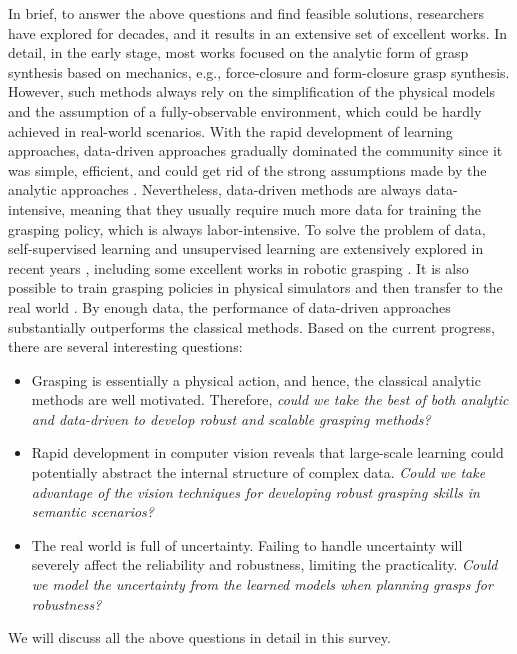 \documentclass[letterpaper,10pt]{article}
\begin{document}
In brief, to answer the above questions and find feasible solutions, researchers have explored for decades, and it results in an extensive set of excellent works. In detail, in the early stage, most works focused on the analytic form of grasp synthesis based on mechanics, e.g., force-closure and form-closure \cite{bicchi1995closure} grasp synthesis. 
However, such methods always rely on the simplification of the physical models and the assumption of a fully-observable environment, which could be hardly achieved in real-world scenarios. 
With the rapid development of learning approaches, data-driven approaches gradually dominated the community since it was simple, efficient, and could get rid of the strong assumptions made by the analytic approaches \cite{bohg2013data}. 
Nevertheless, data-driven methods are always data-intensive, meaning that they usually require much more data for training the grasping policy, which is always labor-intensive.
To solve the problem of data, self-supervised learning and unsupervised learning are extensively explored in recent years \cite{jing2020self, bengio2012unsupervised}, including some excellent works in robotic grasping \cite{mar2015self, pinto2016supersizing, zeng2018learning, berscheid2019improving, berscheid2020self}.
It is also possible to train grasping policies in physical simulators and then transfer to the real world \cite{yan2017sim, james2019sim, iqbal2020toward, yan2019data, zhao2021regnet, zhang2022regrad}.
By enough data, the performance of data-driven approaches substantially outperforms the classical methods.
Based on the current progress, there are several interesting questions:
\begin{itemize}
	\item Grasping is essentially a physical action, and hence, the classical analytic methods are well motivated. Therefore, {\it could we take the best of both analytic and data-driven to develop robust and scalable grasping methods?}
	\item Rapid development in computer vision reveals that large-scale learning could potentially abstract the internal structure of complex data. {\it Could we take advantage of the vision techniques for developing robust grasping skills in semantic scenarios?}
	\item The real world is full of uncertainty. Failing to handle uncertainty will severely affect the reliability and robustness, limiting the practicality. {\it Could we model the uncertainty from the learned models when planning grasps for robustness?}
\end{itemize}
We will discuss all the above questions in detail in this survey.
\end{document}
